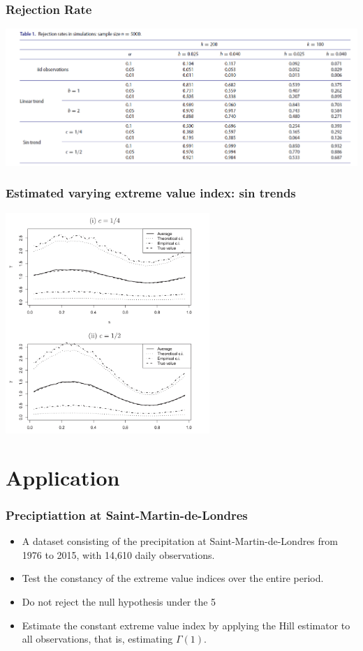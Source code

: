 \documentclass{beamer}
\begin{document}
\begin{frame}
    \frametitle{Rejection Rate}

    \begin{center}
        \includegraphics[width=1\textwidth]{image-20200429225741056}
    \end{center}

\end{frame}

\begin{frame}
    \frametitle{Estimated varying extreme value index: sin trends}
\begin{center}
    \includegraphics[width=0.58\textwidth]{image-20200429225848297}
\end{center}
    

\end{frame}
\section{Application}

\begin{frame}
    \frametitle{Preciptiattion at Saint-Martin-de-Londres}

\begin{itemize}
    \item A dataset consisting of the precipitation at Saint-Martin-de-Londres from 1976 to 2015, with 14,610 daily observations.
    \medskip
    \item Test the constancy of the extreme value indices over the entire period.
    \medskip
    \item Do not reject the null hypothesis under the 5%
    \medskip
    \item Estimate the constant extreme value index by applying the Hill estimator to all observations, that is, estimating $\Gamma(1)$.
\end{itemize}
\end{frame}
\end{document}
